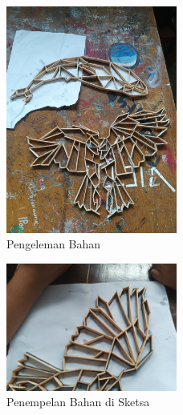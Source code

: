 \documentclass[a4paper,12pt]{article}
\begin{document}
   \begin{figure}
    \begin{center}
      \includegraphics[width=0.50\textwidth]{images/gambar3.jpeg}
    \end{center}
    \caption{Pengeleman Bahan}\label{fig:}
   \end{figure}
   \begin{figure}
    \begin{center}
      \includegraphics[width=0.50\textwidth]{images/gambar4.jpeg}
    \end{center}
    \caption{Penempelan Bahan di Sketsa}\label{fig:}
   \end{figure}
    
\end{document}
